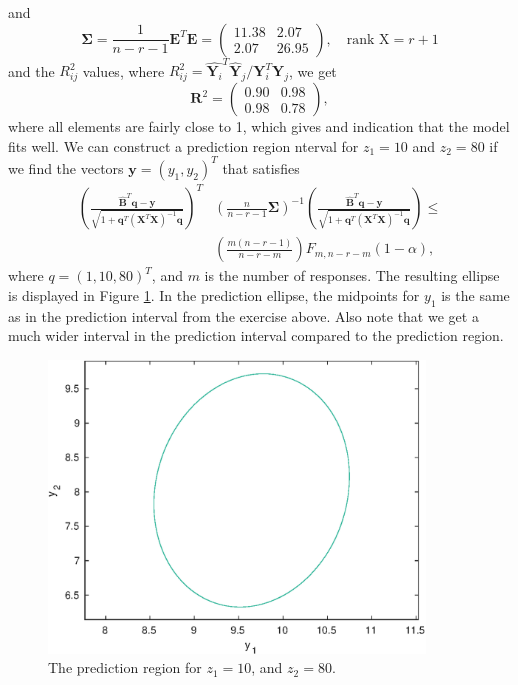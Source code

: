 \message{ !name(examination.tex)}\documentclass[one column]{report}
\renewcommand{\b}[1]{\bm{#1}}
\newcommand{\rank}[1]{\text{rank #1}}
\begin{document}
and
\begin{equation*}
  \b \Sigma = \frac{1}{n-r-1} \b E ^{T} \b E = 
  \begin{pmatrix}
    11.38 &2.07 \\ 
    2.07 &26.95  
  \end{pmatrix},\quad \rank X = r+1
\end{equation*}
and the $R^{2}_{ij}$ values, where $R^{2}_{ij} =  \hat{\b Y_{i}}^{T} 
\hat{\b Y}_{j} /  \b Y_{i}^{T} \b Y_{j}$, we get
\begin{equation*}
  \b R^{2} =
  \begin{pmatrix}
    0.90 &0.98 \\ 
    0.98 &0.78
  \end{pmatrix},
\end{equation*}
where all elements are fairly close to 1, which gives and indication
that the model fits well. We can construct a prediction region nterval for
$z_{1} = 10$ and $z_{2} = 80$ if we find the vectors $\b y =
(y_{1}, y_{2})^{T}$ that
satisfies
\begin{align*}
  \left(
    \frac{\hat{\b B}^{T} \b q - \b y}{\sqrt{1 + \b q^{T}(\b X^{T} \b
        X)^{-1}\b q}}
  \right)^{T} &
  \left(
    \frac{n}{n-r-1}\b \Sigma
  \right)^{-1}
   \left(
    \frac{\hat{\b B}^{T} \b q - \b y}{\sqrt{1 + \b q^{T}(\b X^{T} \b
        X)^{-1}\b q}}
  \right)
\leq \\
  &
    \left(
    \frac{m(n-r-1)}{n-r-m}
    \right)
    F_{m,n-r-m}(1-\alpha),
\end{align*}
where $q = (1, 10, 80)^{T}$, and $m$ is the number of responses. The
resulting ellipse is displayed in Figure \ref{fig:ex5-ellipse}. In the
prediction ellipse, the midpoints for $y_{1}$
is the same as in the prediction interval from the exercise above. Also
note that we get a much wider interval in the
prediction interval compared to the prediction region. 

\begin{figure}
  \centering
  \includegraphics[width=10cm]{ex5-ellipse}
  \caption{The prediction region for $z_1 = 10$, and $z_2 = 80$.}
  \label{fig:ex5-ellipse}
\end{figure}


\end{document}
